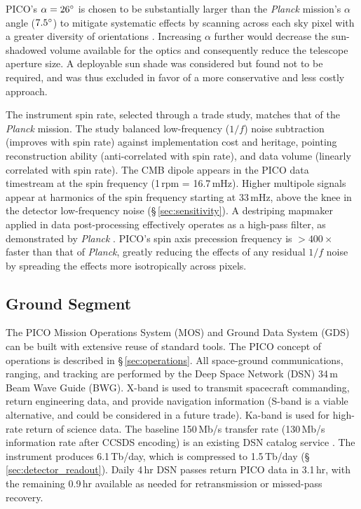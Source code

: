 PICO's $\alpha=26^\circ$ is chosen to be substantially larger than
the \textit{Planck} mission's $\alpha$ angle ($7.5^\circ$) to
mitigate systematic effects by scanning across each sky pixel with a
greater diversity of orientations \citep{Hu2003}. Increasing $\alpha$
further would decrease the sun-shadowed volume available for the
optics and consequently reduce the telescope aperture size. A
deployable sun shade was considered but found not to be required, and
was thus excluded in favor of a more conservative and less costly
approach.

The instrument spin rate, selected through a trade study, matches that
of the \textit{Planck} mission. The study balanced low-frequency
($1/f$) noise subtraction (improves with spin rate) against
implementation cost and heritage, pointing reconstruction ability
(anti-correlated with spin rate), and data volume (linearly correlated
with spin rate).  The CMB dipole appears in the PICO data timestream
at the spin frequency (1\,rpm = 16.7\,mHz). Higher multipole signals
appear at harmonics of the spin frequency starting at 33\,mHz, above
the knee in the detector low-frequency noise
(\S\,\ref{sec:sensitivity}). A destriping mapmaker applied in data
post-processing effectively operates as a high-pass filter, as
demonstrated by \textit{Planck} \citep{Kurki-Suonio2009}. PICO's spin
axis precession frequency is $>400\times$ faster than that of
\textit{Planck}, greatly reducing the effects of any residual $1/f$
noise by spreading the effects more isotropically across pixels.

\subsection{Ground Segment}
\label{sec:ground_segment} %

The PICO Mission Operations System (MOS) and Ground Data System (GDS)
can be built with extensive reuse of standard tools. The PICO concept
of operations is described in \S\,\ref{sec:operations}. 
All space-ground communications, ranging, and tracking are performed
by the Deep Space Network (DSN) 34\,m Beam Wave Guide (BWG). X-band is
used to transmit spacecraft commanding, return engineering data, and
provide navigation information (S-band is a viable alternative, and
could be considered in a future trade). Ka-band is used for high-rate
return of science data.  The baseline 150\,Mb/s transfer rate
(130\,Mb/s information rate after CCSDS encoding) is an existing DSN
catalog service \cite{DSN2015}.  The instrument produces 6.1\,Tb/day,
which is compressed to 1.5\,Tb/day
(\S\,\ref{sec:detector_readout}). Daily 4\,hr DSN passes return PICO
data in 3.1\,hr, with the remaining 0.9\,hr available as needed for
retransmission or missed-pass recovery.


